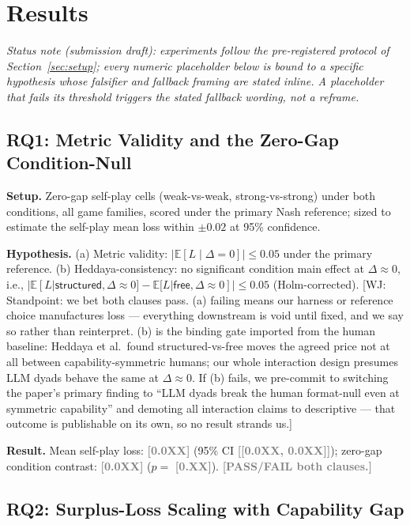 \documentclass[conference]{IEEEtran}
\newcommand{\ph}[1]{\textcolor{Gray}{\textbf{[#1]}}}
\newcommand{\wj}[1]{\textcolor{RedOrange}{\footnotesize\textsf{[WJ: #1]}}}
\begin{document}
\section{Results}
\label{sec:results}

\noindent\textit{Status note (submission draft): experiments follow the pre-registered protocol of Section~\ref{sec:setup}; every numeric placeholder below is bound to a specific hypothesis whose falsifier and fallback framing are stated inline. A placeholder that fails its threshold triggers the stated fallback wording, not a reframe.}

\subsection{RQ1: Metric Validity and the Zero-Gap Condition-Null}
\label{sec:rq1}

\textbf{Setup.} Zero-gap self-play cells (weak-vs-weak, strong-vs-strong) under both conditions, all game families, scored under the primary Nash reference; sized to estimate the self-play mean loss within $\pm 0.02$ at 95\% confidence.

\textbf{Hypothesis.} (a) Metric validity: $|\mathbb{E}[L \mid \Delta{=}0]| \leq 0.05$ under the primary reference. (b) Heddaya-consistency: no significant condition main effect at $\Delta{\approx}0$, i.e., $|\mathbb{E}[L|\textsf{structured},\Delta{\approx}0] - \mathbb{E}[L|\textsf{free},\Delta{\approx}0]| \leq 0.05$ (Holm-corrected). \wj{Standpoint: we bet both clauses pass. (a) failing means our harness or reference choice manufactures loss --- everything downstream is void until fixed, and we say so rather than reinterpret. (b) is the binding gate imported from the human baseline: Heddaya et al.\ found structured-vs-free moves the agreed price not at all between capability-symmetric humans; our whole interaction design presumes LLM dyads behave the same at $\Delta{\approx}0$. If (b) fails, we pre-commit to switching the paper's primary finding to ``LLM dyads break the human format-null even at symmetric capability'' and demoting all interaction claims to descriptive --- that outcome is publishable on its own, so no result strands us.}

\textbf{Result.} Mean self-play loss: \ph{0.0XX} (95\% CI \ph{[0.0XX, 0.0XX]}); zero-gap condition contrast: \ph{0.0XX} ($p = $ \ph{0.XX}). \ph{PASS/FAIL both clauses.}

\subsection{RQ2: Surplus-Loss Scaling with Capability Gap}
\label{sec:rq2}
\end{document}
